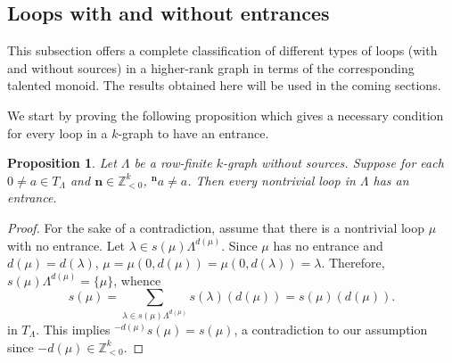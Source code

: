 \documentclass[a4paper,reqno,12pt]{amsart}
\numberwithin{equation}{section}
\newtheorem{prop}[thm]{Proposition}
\theoremstyle{definition}
\theoremstyle{remark}
\newcommand{\N}{\mathbf{n}}
\begin{document}
\subsection{Loops with and without entrances}\label{ssec loops}
This subsection offers a complete classification of different types of loops (with and without sources) in a higher-rank graph in terms of the corresponding talented monoid. The results obtained here will be used in the coming sections.

We start by proving the following proposition which gives a necessary condition for every loop in a $k$-graph to have an entrance.
\begin{prop}\label{pro sufficient condition for loop with entrance}
Let $\Lambda$ be a row-finite $k$-graph without sources. Suppose for each $0\neq a\in T_\Lambda$ and $\N\in \mathbb{Z}_{<0}^k$, $^\N a\neq a$. Then every nontrivial loop in $\Lambda$ has an entrance.
\end{prop}
\begin{proof}
For the sake of a contradiction, assume that there is a nontrivial loop $\mu$ with no entrance. Let $\lambda\in s(\mu)\Lambda^{d(\mu)}$. Since $\mu$ has no entrance and $d(\mu)=d(\lambda)$, $\mu=\mu(0,d(\mu))=\mu(0,d(\lambda))=\lambda$. Therefore, $s(\mu)\Lambda^{d(\mu)}=\{\mu\}$, whence \[s(\mu)=\displaystyle{\sum_{\lambda\in s(\mu)\Lambda^{d(\mu)}}} s(\lambda)(d(\mu))=s(\mu)(d(\mu)).\] in $T_\Lambda$. This implies $^{-d(\mu)}s(\mu)=s(\mu)$, a contradiction to our assumption since $-d(\mu)\in \mathbb{Z}_{<0}^k$. 
\end{proof}
\end{document}
